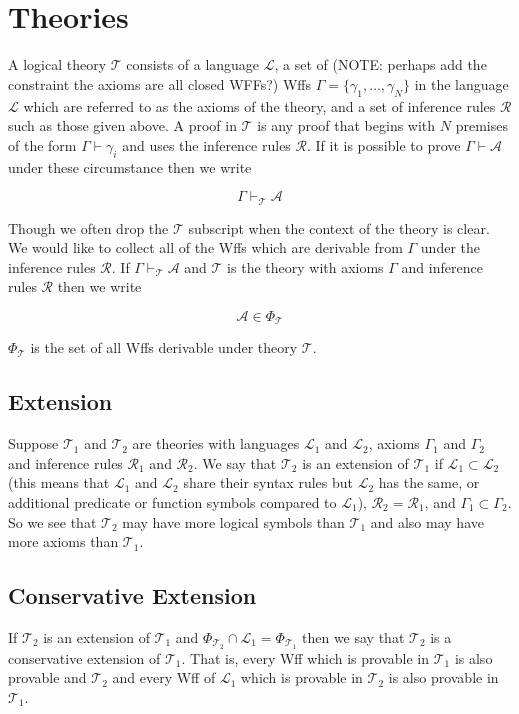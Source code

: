 \documentclass[12pt]{article}
\newcommand{\mc}[1]{\mathcal{#1}}
\begin{document}
\section{Theories}

A logical theory $\mc{T}$ consists of a language $\mc{L}$, a set of (NOTE: perhaps add the constraint the axioms are all closed WFFs?) Wffs $\Gamma = \{\gamma_1, \ldots, \gamma_N\}$ in the language $\mc{L}$ which are referred to as the axioms of the theory, and a set of inference rules $\mc{R}$ such as those given above.
A proof in $\mc{T}$ is any proof that begins with $N$ premises of the form $\Gamma \vdash \gamma_i$ and uses the inference rules $\mc{R}$.
If it is possible to prove $\Gamma \vdash \mc{A}$ under these circumstance then we write

$$
\Gamma \vdash_{\mc{T}} \mc{A}
$$

Though we often drop the $\mc{T}$ subscript when the context of the theory is clear.
We would like to collect all of the Wffs which are derivable from $\Gamma$ under the inference rules $\mc{R}$.
If $\Gamma \vdash_{\mc{T}} \mc{A}$ and $\mc{T}$ is the theory with axioms $\Gamma$ and inference rules $\mc{R}$ then we write

$$
\mc{A} \in \Phi_{\mc{T}}
$$

$\Phi_{\mc{T}}$ is the set of all Wffs derivable under theory $\mc{T}$.

\subsection*{Extension}
Suppose $\mc{T}_1$ and $\mc{T}_2$ are theories with languages $\mc{L}_1$ and $\mc{L}_2$, axioms $\Gamma_1$ and $\Gamma_2$ and inference rules $\mc{R}_1$ and $\mc{R}_2$. We say that $\mc{T}_2$ is an extension of $\mc{T}_1$ if $\mc{L}_1 \subset \mc{L}_2$ (this means that $\mc{L}_1$ and $\mc{L}_2$ share their syntax rules but $\mc{L}_2$ has the same, or additional predicate or function symbols compared to $\mc{L}_1$), $\mc{R}_2 = \mc{R}_1$, and $\Gamma_1 \subset \Gamma_2$.
So we see that $\mc{T}_2$ may have more logical symbols than $\mc{T}_1$ and also may have more axioms than $\mc{T}_1$.

\subsection*{Conservative Extension}
If $\mc{T}_2$ is an extension of $\mc{T}_1$ and $\Phi_{\mc{T}_2} \cap \mc{L}_1 = \Phi_{\mc{T}_1}$ then we say that $\mc{T}_2$ is a conservative extension of $\mc{T}_1$.
That is, every Wff which is provable in $\mc{T}_1$ is also provable and $\mc{T}_2$ and every Wff of $\mc{L}_1$ which is provable in $\mc{T}_2$ is also provable in $\mc{T}_1$.
\end{document}
